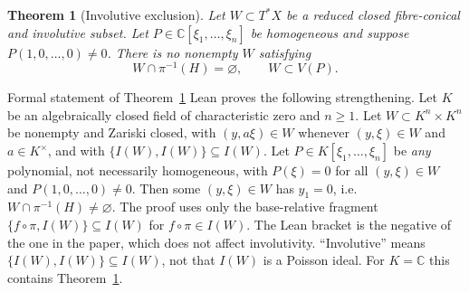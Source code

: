 \documentclass[11pt]{amsart}
\numberwithin{equation}{section}
\newtheorem{theorem}{Theorem}[section]
\theoremstyle{plain}
\theoremstyle{remark}
\begin{document}
\begin{theorem}[Involutive exclusion]\label{thm:coisotropic-exclusion} %
Let $W\subset T^*X$ be a reduced closed fibre-conical and involutive subset. Let
$P\in \mathbb C[\xi_1,\ldots,\xi_n]$ be homogeneous and suppose
$P(1,0,\ldots,0)\neq0$.
There is no nonempty $W$ satisfying
\[
 W\cap\pi^{-1}(H)=\varnothing,\qquad W\subset V(P).
\]
\end{theorem}
\begin{AIaddition}{Formal statement of Theorem~\ref{thm:coisotropic-exclusion}}
Lean proves the following strengthening. Let $K$ be an algebraically closed field of characteristic zero and $n\ge1$.
Let $W\subset K^n\times K^n$ be nonempty and Zariski closed, with
$(y,a\xi)\in W$ whenever $(y,\xi)\in W$ and $a\in K^\times$, and with
$\{I(W),I(W)\}\subseteq I(W)$. Let $P\in K[\xi_1,\dots,\xi_n]$ be \emph{any}
polynomial, not necessarily homogeneous, with $P(\xi)=0$ for all $(y,\xi)\in W$ and
$P(1,0,\dots,0)\neq0$. Then some $(y,\xi)\in W$ has $y_1=0$, i.e.\
$W\cap\pi^{-1}(H)\neq\varnothing$. The proof uses only the base-relative
fragment $\{f\circ\pi,I(W)\}\subseteq I(W)$ for $f\circ\pi\in I(W)$. The Lean bracket is
the negative of the one in the paper, which does not affect involutivity.
``Involutive'' means $\{I(W),I(W)\}\subseteq I(W)$, not that $I(W)$ is a Poisson ideal.
For $K=\mathbb C$ this contains Theorem~\ref{thm:coisotropic-exclusion}.
\end{AIaddition}
\end{document}
